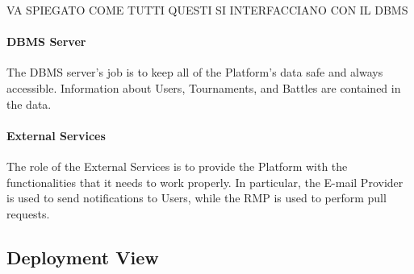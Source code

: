 VA SPIEGATO COME TUTTI QUESTI SI INTERFACCIANO CON IL DBMS
\newpage
{}
\newpage
\paragraph{DBMS Server}
The DBMS server's job is to keep all of the Platform's data safe and always accessible. Information about Users, Tournaments, and Battles are contained in the data.

\paragraph{External Services}
The role of the External Services is to provide the Platform with the functionalities that it needs to work properly. In particular, the E-mail Provider is used to send notifications to Users, while the RMP is used to perform pull requests.            
\newpage

\subsection{Deployment View}

